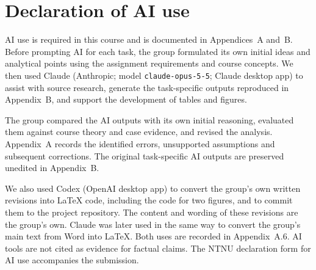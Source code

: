 \section*{Declaration of AI use}

AI use is required in this course and is documented in Appendices~A and~B. Before prompting AI for each task, the group formulated its own initial ideas and analytical points using the assignment requirements and course concepts. We then used Claude (Anthropic; model \texttt{claude-opus-5-5}; Claude desktop app) to assist with source research, generate the task-specific outputs reproduced in Appendix~B, and support the development of tables and figures.

The group compared the AI outputs with its own initial reasoning, evaluated them against course theory and case evidence, and revised the analysis. Appendix~A records the identified errors, unsupported assumptions and subsequent corrections. The original task-specific AI outputs are preserved unedited in Appendix~B. 

We also used Codex (OpenAI desktop app) to convert the group's own written revisions into LaTeX code, including the code for two figures, and to commit them to the project repository. The content and wording of these revisions are the group's own. Claude was later used in the same way to convert the group's main text from Word into LaTeX. Both uses are recorded in Appendix~A.6. AI tools are not cited as evidence for factual claims. The NTNU declaration form for AI use accompanies the submission.